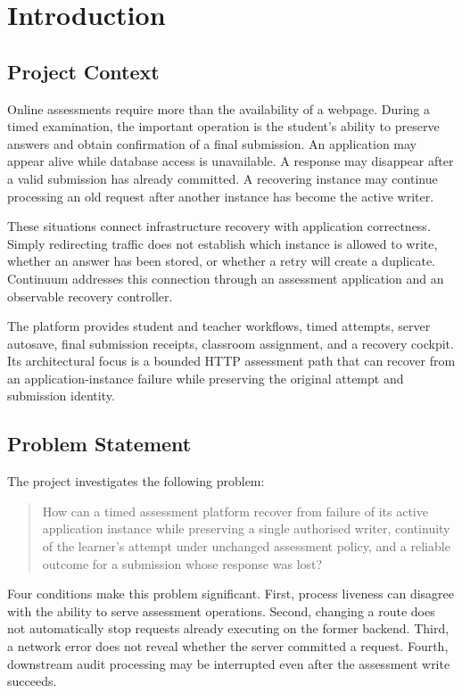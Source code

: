 \chapter{Introduction}
\section{Project Context}
Online assessments require more than the availability of a webpage. During a timed examination, the important operation is the student's ability to preserve answers and obtain confirmation of a final submission. An application may appear alive while database access is unavailable. A response may disappear after a valid submission has already committed. A recovering instance may continue processing an old request after another instance has become the active writer.

These situations connect infrastructure recovery with application correctness. Simply redirecting traffic does not establish which instance is allowed to write, whether an answer has been stored, or whether a retry will create a duplicate. Continuum addresses this connection through an assessment application and an observable recovery controller.

The platform provides student and teacher workflows, timed attempts, server autosave, final submission receipts, classroom assignment, and a recovery cockpit. Its architectural focus is a bounded HTTP assessment path that can recover from an application-instance failure while preserving the original attempt and submission identity.
\section{Problem Statement}
The project investigates the following problem:
\begin{quote}
How can a timed assessment platform recover from failure of its active application instance while preserving a single authorised writer, continuity of the learner's attempt under unchanged assessment policy, and a reliable outcome for a submission whose response was lost?
\end{quote}
Four conditions make this problem significant. First, process liveness can disagree with the ability to serve assessment operations. Second, changing a route does not automatically stop requests already executing on the former backend. Third, a network error does not reveal whether the server committed a request. Fourth, downstream audit processing may be interrupted even after the assessment write succeeds.

